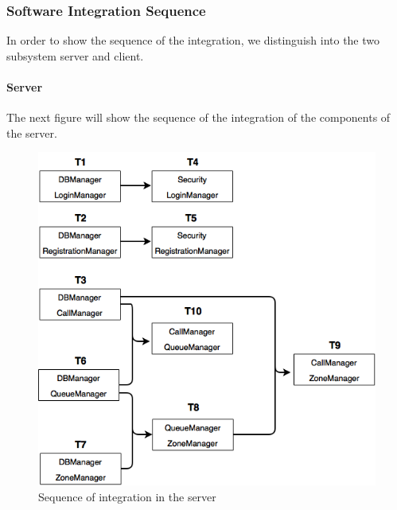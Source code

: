 \subsubsection{Software Integration Sequence}
In order to show the sequence of the integration, we distinguish into the two subsystem server and client.

\newpage
\paragraph{Server}\mbox{}
\newline 
The next figure will show the sequence of the integration of the components of the server.
\newline

\begin{figure}[H]
    \centering
    \includegraphics[width=13cm]{./Images/System-2.png}
    \caption{Sequence of integration in the server}
    \label{fig: Sequence of integration in the server}
\end{figure}
\newpage

